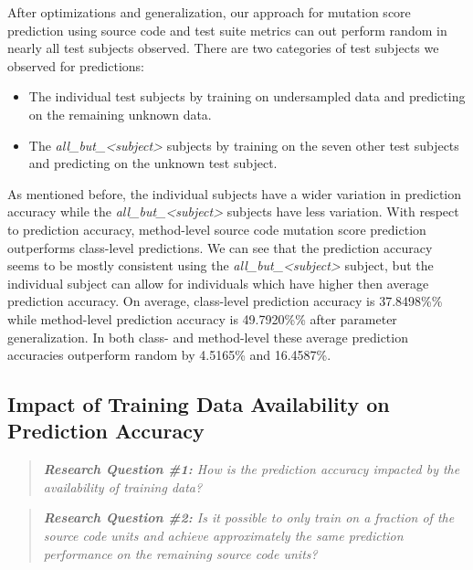 After optimizations and generalization, our approach for mutation score prediction using source code and test suite metrics can out perform random in nearly all test subjects observed. There are two categories of test subjects we observed for predictions:

\begin{itemize}
  \item The individual test subjects by training on undersampled data and predicting on the remaining unknown data.
  \item The \emph{all\_but\_<subject>} subjects by training on the seven other test subjects and predicting on the unknown test subject.
\end{itemize}

As mentioned before, the individual subjects have a wider variation in prediction accuracy while the \emph{all\_but\_<subject>} subjects have less variation. With respect to prediction accuracy, method-level source code mutation score prediction outperforms class-level predictions. We can see that the prediction accuracy seems to be mostly consistent using the \emph{all\_but\_<subject>} subject, but the individual subject can allow for individuals which have higher then average prediction accuracy. On average, class-level prediction accuracy is 37.8498\%\% while method-level prediction accuracy is 49.7920\%\% after parameter generalization. In both class- and method-level these average prediction accuracies outperform random by 4.5165\% and 16.4587\%.


\subsection{Impact of Training Data Availability on Prediction Accuracy}
\label{subsec:experiment_data}
\begin{quote}
  \emph{\textbf{Research Question \#1:} How is the prediction accuracy impacted by the availability of training data?}
\end{quote}

\begin{quote}
  \emph{\textbf{Research Question \#2:} Is it possible to only train on a fraction of the source code units and achieve approximately the same prediction performance on the remaining source code units?}
\end{quote}

